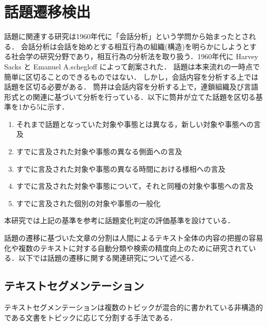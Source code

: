 \section{話題遷移検出}
\label{rel:topic}
話題に関連する研究は1960年代に「会話分析」という学問から始まったとされる．
会話分析は会話を始めとする相互行為の組織(構造)を明らかにしようとする社会学の研究分野であり，相互行為の分析法を取り扱う．1960年代に Harvey Sacks と Emanuel A.schegloff によって創案された\cite{convAnalysis}．
%
話題は本来流れの一時点で簡単に区切ることのできるものではない．
しかし，会話内容を分析する上では話題を区切る必要がある．
筒井\cite{zatsudan}は会話内容を分析する上で，連鎖組織及び言語形式との関連に基づいて分析を行っている．以下に筒井が立てた話題を区切る基準を1から5に示す．
\begin{enumerate}
  \item それまで話題となっていた対象や事態とは異なる，新しい対象や事態への言及\label{enum:zatsudan1}
  \item すでに言及された対象や事態の異なる側面への言及
  \item すでに言及された対象や事態の異なる時間における様相への言及
  \item すでに言及された対象や事態について，それと同種の対象や事態への言及
  \item すでに言及された個別の対象や事態の一般化\label{enum:zatsudan5}
\end{enumerate}
本研究では上記の基準を参考に話題変化判定の評価基準を設けている．

話題の遷移に基づいた文章の分割は人間によるテキスト全体の内容の把握の容易化や複数のテキストに対する自動分類や検索の精度向上のために研究されている．以下では話題の遷移に関する関連研究について述べる．
\subsection{テキストセグメンテーション}
テキストセグメンテーションは複数のトピックが混合的に書かれている非構造的である文書をトピックに応じて分割する手法である．
